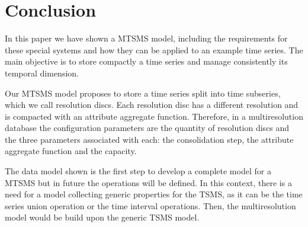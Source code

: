 \section{Conclusion} 
\label{sec:concl-future-work}

In this paper we have shown a MTSMS model, including the requirements
for these special systems and how they can be applied to an example
time series. The main objective is to store compactly a time series
and manage consistently its temporal dimension.

Our MTSMS model proposes to store a time series split into time
subseries, which we call resolution discs.  Each resolution disc has a
different resolution and is compacted with an attribute aggregate
function. Therefore, in a multiresolution database the configuration
parameters are the quantity of resolution discs and the three
parameters associated with each: the consolidation step, the attribute
aggregate function and the capacity.

The data model shown is the first step to develop a complete model for
a MTSMS but in future the operations will be defined. In this context,
there is a need for a model collecting generic properties for the
TSMS, as it can be the time series union operation or the time
interval operations. Then, the multiresolution model would be build
upon the generic TSMS model.




